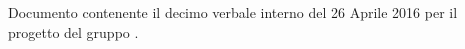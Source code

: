 Documento contenente il decimo verbale interno del 26 Aprile 2016 per il progetto \progetto{} del gruppo \gruppo{}.

